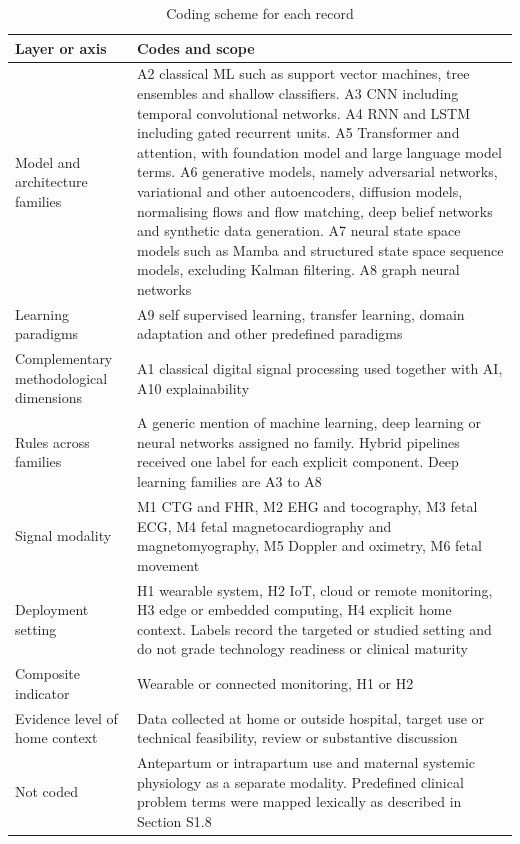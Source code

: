 \begin{table}[!ht]
\caption{Coding scheme for each record}
\centering
\small
\begin{tabularx}{\textwidth}{@{}L{4.2cm}Y@{}}
\toprule
Layer or axis & Codes and scope \\
\midrule
Model and architecture families & A2 classical ML such as support vector machines, tree ensembles and shallow classifiers. A3 CNN including temporal convolutional networks. A4 RNN and LSTM including gated recurrent units. A5 Transformer and attention, with foundation model and large language model terms. A6 generative models, namely adversarial networks, variational and other autoencoders, diffusion models, normalising flows and flow matching, deep belief networks and synthetic data generation. A7 neural state space models such as Mamba and structured state space sequence models, excluding Kalman filtering. A8 graph neural networks \\
Learning paradigms & A9 self supervised learning, transfer learning, domain adaptation and other predefined paradigms \\
Complementary methodological dimensions & A1 classical digital signal processing used together with AI, A10 explainability \\
Rules across families & A generic mention of machine learning, deep learning or neural networks assigned no family. Hybrid pipelines received one label for each explicit component. Deep learning families are A3 to A8 \\
Signal modality & M1 CTG and FHR, M2 EHG and tocography, M3 fetal ECG, M4 fetal magnetocardiography and magnetomyography, M5 Doppler and oximetry, M6 fetal movement \\
Deployment setting & H1 wearable system, H2 IoT, cloud or remote monitoring, H3 edge or embedded computing, H4 explicit home context. Labels record the targeted or studied setting and do not grade technology readiness or clinical maturity \\
Composite indicator & Wearable or connected monitoring, H1 or H2 \\
Evidence level of home context & Data collected at home or outside hospital, target use or technical feasibility, review or substantive discussion \\
Not coded & Antepartum or intrapartum use and maternal systemic physiology as a separate modality. Predefined clinical problem terms were mapped lexically as described in Section S1.8 \\
\bottomrule
\end{tabularx}
\end{table}
